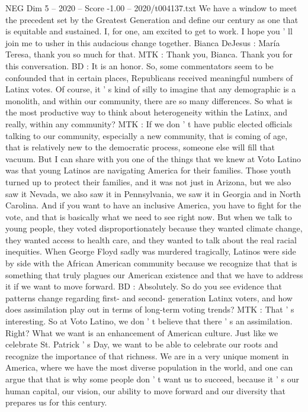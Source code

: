 \begin{textsample}{NEG Dim 5 – 2020 – Score -1.00 – 2020/t004137.txt}
We have a window to meet the precedent set by the Greatest Generation and define our century as one that is equitable and sustained.
I, for one, am excited to get to work.
I hope you ' ll join me to usher in this audacious change together.
Bianca DeJesus : María Teresa, thank you so much for that.
MTK : Thank you, Bianca.
Thank you for this conversation.
BD : It is an honor.
So, some commentators seem to be confounded that in certain places, Republicans received meaningful numbers of Latinx votes.
Of course, it ' s kind of silly to imagine that any demographic is a monolith, and within our community, there are so many differences.
So what is the most productive way to think about heterogeneity within the Latinx, and really, within any community?
MTK : If we don ' t have public elected officials talking to our community, especially a new community, that is coming of age, that is relatively new to the democratic process, someone else will fill that vacuum.
But I can share with you one of the things that we knew at Voto Latino was that young Latinos are navigating America for their families.
Those youth turned up to protect their families, and it was not just in Arizona, but we also saw it Nevada, we also saw it in Pennsylvania, we saw it in Georgia and in North Carolina.
And if you want to have an inclusive America, you have to fight for the vote, and that is basically what we need to see right now.
But when we talk to young people, they voted disproportionately because they wanted climate change, they wanted access to health care, and they wanted to talk about the real racial inequities.
When George Floyd sadly was murdered tragically, Latinos were side by side with the African American community because we recognize that that is something that truly plagues our American existence and that we have to address it if we want to move forward.
BD : Absolutely.
So do you see evidence that patterns change regarding first- and second- generation Latinx voters, and how does assimilation play out in terms of long-term voting trends?
MTK : That ' s interesting.
So at Voto Latino, we don ' t believe that there ' s an assimilation.
Right?
What we want is an enhancement of American culture.
Just like we celebrate St.
Patrick ' s Day, we want to be able to celebrate our roots and recognize the importance of that richness.
We are in a very unique moment in America, where we have the most diverse population in the world, and one can argue that that is why some people don ' t want us to succeed, because it ' s our human capital, our vision, our ability to move forward and our diversity that prepares us for this century.

\end{textsample}
